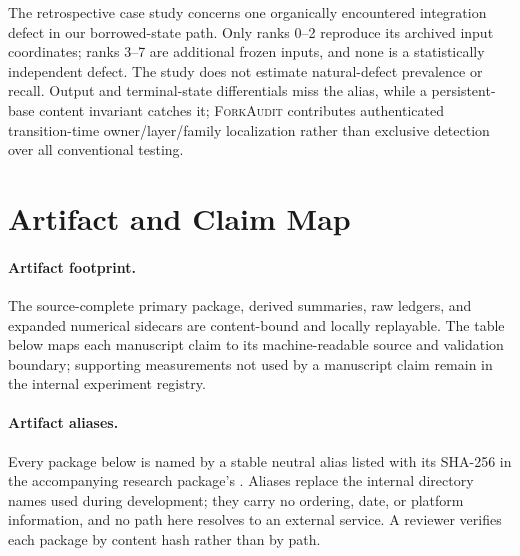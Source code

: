 \documentclass{article}
\newcommand{\method}{\textsc{ForkAudit}}
\begin{document}
The retrospective case study concerns one organically encountered integration
defect in our borrowed-state path.  Only ranks 0--2 reproduce its archived
input coordinates; ranks 3--7 are additional frozen inputs, and none is a
statistically independent defect.  The study does not estimate natural-defect
prevalence or recall.  Output and terminal-state differentials miss the alias,
while a persistent-base content invariant catches it; \method{} contributes
authenticated transition-time owner/layer/family localization rather than
exclusive detection over all conventional testing.

\section{Artifact and Claim Map}
\label{app:artifact}

\paragraph{Artifact footprint.}
The source-complete primary package, derived summaries, raw ledgers, and expanded
numerical sidecars are content-bound and locally replayable.  The table below
maps each manuscript claim to its machine-readable source and validation
boundary; supporting measurements not used by a manuscript claim remain in
the internal experiment registry.

\paragraph{Artifact aliases.}
Every package below is named by a stable neutral alias listed with its SHA-256
in the accompanying research package's .  Aliases replace
the internal directory names used during development; they carry no ordering,
date, or platform information, and no path here resolves to an external
service.  A reviewer verifies each package by content hash rather than by path.
\end{document}
